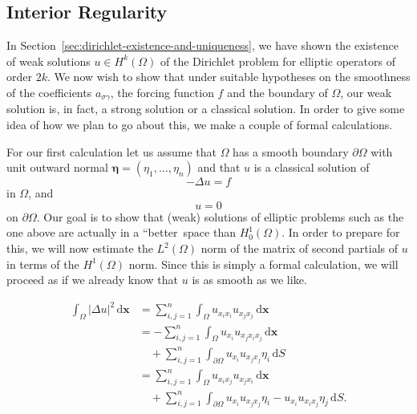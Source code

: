 \subsection{Interior Regularity}\label{sec:elliptic-interior-regularity}

In Section~\ref{sec:dirichlet-existence-and-uniqueness}, we have shown the existence of weak solutions $u\in H^k(\Omega)$ of the Dirichlet problem for elliptic operators of order $2k$. We now wish to show that under suitable hypotheses on the smoothness of the coefficients $a_{\sigma\gamma}$, the forcing function $f$ and the boundary of $\Omega$, our weak solution is, in fact, a strong solution or a classical solution. In order to give some idea of how we plan to go about this, we make a couple of formal calculations.

For our first calculation let us assume that $\Omega$ has a smooth boundary $\partial\Omega$ with unit outward normal $\bm{\eta}=(\eta_1,\ldots,\eta_n)$ and that $u$ is a classical solution of
\begin{equation}\label{eq:interior-regularity-formal-poisson-equation}
-\Delta u=f
\end{equation}
in $\Omega$, and
\begin{equation}\label{eq:interior-regularity-formal-dirichlet-boundary}
u=0
\end{equation}
on $\partial\Omega$. Our goal is to show that (weak) solutions of elliptic problems such as the one above are actually in a ``better\textquotesingle\textquotesingle\ space than $H_0^1(\Omega)$. In order to prepare for this, we will now estimate the $L^2(\Omega)$ norm of the matrix of second partials of $u$ in terms of the $H^1(\Omega)$ norm. Since this is simply a formal calculation, we will proceed as if we already know that $u$ is as smooth as we like.

\[\begin{aligned}
\int_\Omega|\Delta u|^2\,\mathrm{d}\bm{x}
&=\sum_{i,j=1}^n\int_\Omega u_{x_ix_i}u_{x_jx_j}\,\mathrm{d}\bm{x}\\
&=-\sum_{i,j=1}^n\int_\Omega u_{x_i}u_{x_jx_ix_j}\,\mathrm{d}\bm{x}\\
&\quad+\sum_{i,j=1}^n\int_{\partial\Omega}u_{x_i}u_{x_jx_j}\eta_i\,\mathrm{d}S\\
&=\sum_{i,j=1}^n\int_\Omega u_{x_ix_j}u_{x_jx_i}\,\mathrm{d}\bm{x}\\
&\quad+\sum_{i,j=1}^n\int_{\partial\Omega}u_{x_i}u_{x_jx_j}\eta_i-u_{x_i}u_{x_ix_j}\eta_j\,\mathrm{d}S.
\end{aligned}\]

